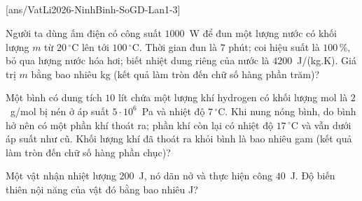 	\subsection*{}
	\setcounter{ex}{0}
	[ans/VatLi2026-NinhBinh-SoGD-Lan1-3]

	\begin{ex}%
		Người ta dùng ấm điện có công suất $1000$~W để đun một lượng nước có khối lượng $m$ từ $20\,^\circ\text{C}$ lên tới $100\,^\circ\text{C}$. Thời gian đun là $7$ phút; coi hiệu suất là $100\,\%$, bỏ qua lượng nước hóa hơi; biết nhiệt dung riêng của nước là $4200$~J/(kg.K). Giá trị $m$ bằng bao nhiêu kg (kết quả làm tròn đến chữ số hàng phần trăm)?
		\par
	\end{ex}

	\begin{ex}%
		Một bình có dung tích $10$ lít chứa một lượng khí hydrogen có khối lượng mol là $2$~g/mol bị nén ở áp suất $5\cdot 10^6$~Pa và nhiệt độ $7\,^\circ\text{C}$. Khi nung nóng bình, do bình hở nên có một phần khí thoát ra; phần khí còn lại có nhiệt độ $17\,^\circ\text{C}$ và vẫn dưới áp suất như cũ. Khối lượng khí đã thoát ra khỏi bình là bao nhiêu gam (kết quả làm tròn đến chữ số hàng phần chục)?
		\par
	\end{ex}

	\begin{ex}%
		Một vật nhận nhiệt lượng $200$~J, nó dãn nở và thực hiện công $40$~J. Độ biến thiên nội năng của vật đó bằng bao nhiêu J?
		\par
	\end{ex}

